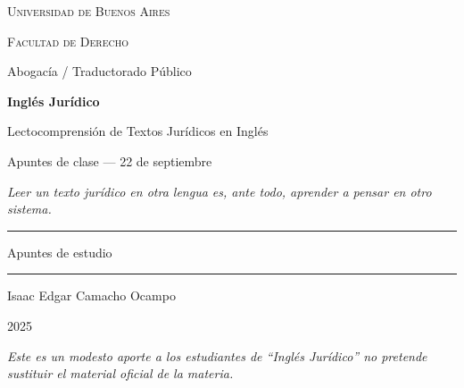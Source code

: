 \documentclass[12pt,oneside]{book}
\newcommand{\universidad}{Universidad de Buenos Aires}
\newcommand{\facultad}{Facultad de Derecho}
\newcommand{\carrera}{Abogacía / Traductorado Público}
\newcommand{\titulo}{Apuntes de clase --- 22 de septiembre}
\newcommand{\autor}{Isaac Edgar Camacho Ocampo}
\newcommand{\anio}{2025}
\begin{document}
\begin{titlepage}

\thispagestyle{empty}

\begin{center}

\vspace*{1cm}

{\large \textsc{\universidad}}

\vspace{0.2cm}

{\large \textsc{\facultad}}

\vspace{0.2cm}

{\large \carrera}

\vspace{3cm}

{\Huge \textbf{Inglés Jurídico}}

\vspace{0.5cm}

{\Large Lectocomprensión de Textos Jurídicos en Inglés}

\vspace{1cm}

{\LARGE \titulo}

\vspace{0.8cm}

\textit{Leer un texto jurídico en otra lengua es, ante todo, aprender a pensar en otro sistema.}

\vspace{1.2cm}

\rule{0.70\textwidth}{0.5pt}

\vspace{0.5cm}

{\large Apuntes de estudio}

\vspace{0.5cm}

\rule{0.70\textwidth}{0.5pt}

\vfill

{\large \autor}

\vspace{0.3cm}

{\large \anio}

\end{center}

\vfill

\begin{flushleft}
\textit{Este es un modesto aporte a los estudiantes de ``Inglés Jurídico'' no pretende sustituir el material oficial de la materia.}
\end{flushleft}

\end{titlepage}
\end{document}

